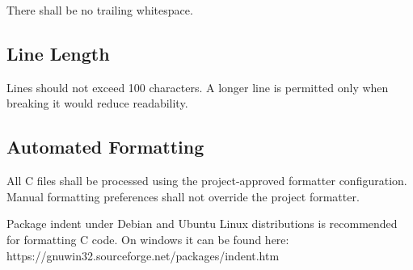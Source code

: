 There shall be no trailing whitespace.

\subsection{Line Length}

Lines should not exceed 100 characters. A longer line is permitted only when breaking it would reduce readability.

\subsection{Automated Formatting}

All C files shall be processed using the project-approved formatter configuration. Manual formatting preferences shall not override the project formatter.

Package indent under Debian and Ubuntu Linux distributions is recommended for formatting C code.
On windows it can be found here: https://gnuwin32.sourceforge.net/packages/indent.htm